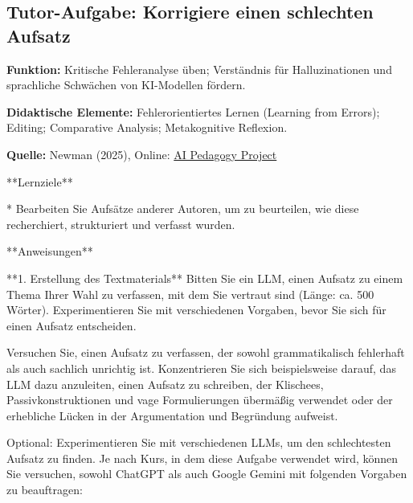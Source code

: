 \documentclass[
  ngerman,
  letterpaper,
  DIV=11]{scrreprt}
\newenvironment{Shaded}{\begin{snugshade}}{\end{snugshade}}
\newcommand{\NormalTok}[1]{\textcolor[rgb]{0.00,0.23,0.31}{#1}}
\newcommand{\SpecialStringTok}[1]{\textcolor[rgb]{0.13,0.47,0.30}{#1}}
\begin{document}
\subsection{Tutor-Aufgabe: Korrigiere einen schlechten
Aufsatz}\label{sec-prompt-aufsatz-korrigieren}

\textbf{Funktion:} Kritische Fehleranalyse üben; Verständnis für
Halluzinationen und sprachliche Schwächen von KI-Modellen fördern.

\textbf{Didaktische Elemente:} Fehlerorientiertes Lernen (Learning from
Errors); Editing; Comparative Analysis; Metakognitive Reflexion.

\textbf{Quelle:} Newman (2025), Online:
\href{https://aipedagogy.org/assignment/generative-ai-and-stasis-theory/}{AI
Pedagogy Project}

\begin{tcolorbox}[enhanced jigsaw, left=2mm, bottomrule=.15mm, arc=.35mm, rightrule=.15mm, colframe=quarto-callout-note-color-frame, coltitle=black, colback=white, toprule=.15mm, toptitle=1mm, colbacktitle=quarto-callout-note-color!10!white, title=\textcolor{quarto-callout-note-color}{\faInfo}\hspace{0.5em}{Tutor-Aufgabe: Korrektur eines KI-generierten Aufsatzes}, opacitybacktitle=0.6, leftrule=.75mm, bottomtitle=1mm, titlerule=0mm, opacityback=0, breakable]

\begin{Shaded}
\begin{Highlighting}[]
\NormalTok{**Lernziele**}

\SpecialStringTok{* }\NormalTok{Bearbeiten Sie Aufsätze anderer Autoren, um zu beurteilen, wie diese recherchiert, strukturiert und verfasst wurden.}

\NormalTok{**Anweisungen**}

\NormalTok{**1. Erstellung des Textmaterials**}
\NormalTok{Bitten Sie ein LLM, einen Aufsatz zu einem Thema Ihrer Wahl zu verfassen, mit dem Sie vertraut sind (Länge: ca. 500 Wörter). Experimentieren Sie mit verschiedenen Vorgaben, bevor Sie sich für einen Aufsatz entscheiden.}

\NormalTok{Versuchen Sie, einen Aufsatz zu verfassen, der sowohl grammatikalisch fehlerhaft als auch sachlich unrichtig ist. Konzentrieren Sie sich beispielsweise darauf, das LLM dazu anzuleiten, einen Aufsatz zu schreiben, der Klischees, Passivkonstruktionen und vage Formulierungen übermäßig verwendet oder der erhebliche Lücken in der Argumentation und Begründung aufweist.}

\NormalTok{Optional: Experimentieren Sie mit verschiedenen LLMs, um den schlechtesten Aufsatz zu finden. Je nach Kurs, in dem diese Aufgabe verwendet wird, können Sie versuchen, sowohl ChatGPT als auch Google Gemini mit folgenden Vorgaben zu beauftragen:}


\end{Highlighting}
\end{Shaded}
\end{tcolorbox}
\end{document}
